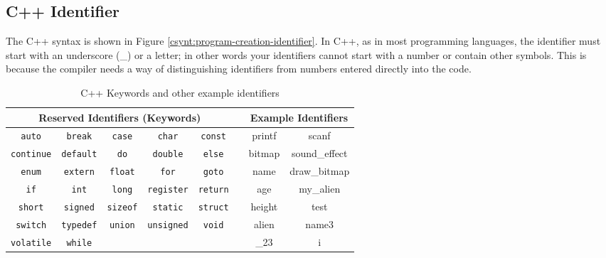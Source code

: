 \clearpage
\subsection{C++ Identifier} %
\label{sub:c_identifier}

The C++  syntax is shown in Figure \ref{csynt:program-creation-identifier}. In C++, as in most programming languages, the identifier must start with an underscore (\_) or a letter; in other words your identifiers cannot start with a number or contain other symbols. This is because the compiler needs a way of distinguishing identifiers from numbers entered directly into the code.


\begin{table}[h]
  \centering
  \begin{tabular}{|ccccc|c|cc|}
    \hline
    \multicolumn{5}{|c|}{\textbf{Reserved Identifiers (Keywords)}} & & \multicolumn{2}{c|}{\textbf{Example Identifiers}} \\
    \hline
    \texttt{auto}     &   \texttt{break}    & \texttt{case}     &   \texttt{char}     &   \texttt{const}  & & printf & scanf  \\         
    \texttt{continue} &   \texttt{default}  &  \texttt{do}      &   \texttt{double}   &   \texttt{else}   & & bitmap & sound\_effect  \\
    \texttt{enum}     &   \texttt{extern}   & \texttt{float}    &   \texttt{for}      &   \texttt{goto}   & & name & draw\_bitmap  \\
    \texttt{if}       &   \texttt{int}      &   \texttt{long}   &   \texttt{register} &   \texttt{return} & & age & my\_alien \\         
    \texttt{short}    &   \texttt{signed}   & \texttt{sizeof}   &   \texttt{static}   &   \texttt{struct} & & height & test  \\          
    \texttt{switch}   & \texttt{typedef}  &   \texttt{union}    &   \texttt{unsigned} &   \texttt{void}   & & alien & name3 \\
    \texttt{volatile} &   \texttt{while}    &  & & &                                                        & \_23  & i \\
    \hline
  \end{tabular}
  \caption{C++ Keywords and other example identifiers}
  \label{tbl:program-creation-c identifiers and keywords}
\end{table}

